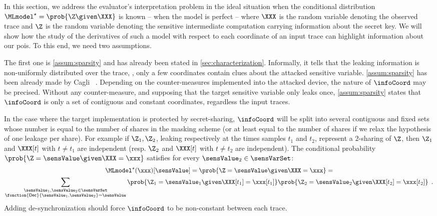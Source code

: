 In this section, we address the evaluator's interpretation problem in the ideal situation when the conditional distribution \(\MLmodel^\star = \prob{\Z \given \XXX}\) is known -- \ie{} when the model is perfect -- where \(\XXX\) is the random variable denoting the observed trace and \(\Z\) is the random variable denoting the sensitive intermediate computation carrying information about the secret key.
We will show how the study of the derivatives of such a model with respect to each coordinate of an input trace can highlight information about our \glspl{poi}. 
To this end, we need two assumptions.

The first one is \autoref{assum:sparsity} and has already been stated in \autoref{sec:characterization}.
Informally, it tells that the leaking information is non-uniformly distributed over the trace, \ie{},  only a few coordinates contain clues about the attacked sensitive variable.
\autoref{assum:sparsity} has been already made \eg{} by Cagli \etal{}~\cite{cagli_enhancing_2016}.
Depending on the counter-measures implemented into the attacked device, the nature of \(\infoCoord\) may be precised. 
Without any counter-measure, and supposing that the target sensitive variable only leaks once, \autoref{assum:sparsity} states that \(\infoCoord\) is only a set of contiguous and constant coordinates, regardless the input traces.

In the case where the target implementation is protected by secret-sharing, \(\infoCoord\) will be split into several contiguous and fixed sets whose number is equal to the number of shares in the masking scheme (or at least equal to the number of shares if we relax the hypothesis of one leakage per share).
For example if \(\Z_1, \Z_2\), leaking respectively at the times samples \(t_1\) and \(t_2\), represent a \(2\)-sharing of \(\Z\), then \(\Z_1\) and \(\XXX[t]\) with \(t \neq t_1\) are independent (resp. \(\Z_2\) and \(\XXX[t]\) with \(t \neq t_2\) are independent). 
The conditional probability \(\prob{\Z = \sensValue \given \XXX = \xxx}\) satisfies for every \(\sensValue_2 \in \sensVarSet\):
\begin{multline}
	\MLmodel^\star(\xxx)[\sensValue] = \prob{\Z = \sensValue \given \XXX = \xxx} = \\
	\sum_{\substack{\sensValue_1, \sensValue_2 \in \sensVarSet \\ \fonction{\mathsf{Dec}}{\sensValue_1, \sensValue_2} = \sensValue}} \prob{\Z_1 = \sensValue_1 \given \XXX[t_1] = \xxx[t_1]} \prob{\Z_2 = \sensValue_2 \given \XXX[t_2] = \xxx[t_2]} \enspace .
\end{multline}
Adding de-synchronization should force \(\infoCoord\) to be non-constant between each 
trace.

